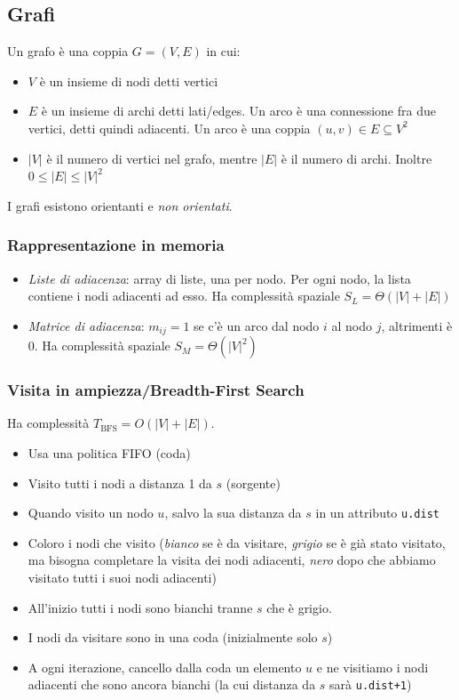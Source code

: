 \documentclass[10pt,a4paper]{article}
\newcommand{\code}{\texttt}
\begin{document}
\begin{multicols*}{2}
\subsection*{Grafi}
Un grafo è una coppia $G = (V,E)$ in cui:
\begin{itemize}
    \item $V$ è un insieme di nodi detti vertici
    \item $E$ è un insieme di archi detti lati/edges. Un arco è una connessione fra due vertici, detti quindi adiacenti. Un arco è una coppia $(u,v) \in E \subseteq V^2$
    \item $|V|$ è il numero di vertici nel grafo, mentre $|E|$ è il numero di archi. Inoltre $0 \le |E| \le |V|^2$
\end{itemize}
I grafi esistono orientanti e \emph{non orientati}.
\subsubsection*{Rappresentazione in memoria}
\begin{itemize}
    \item \emph{Liste di adiacenza}: array di liste, una per nodo. Per ogni nodo, la lista contiene i nodi adiacenti ad esso. Ha complessità spaziale $S_L = \varTheta(|V|+|E|)$
    \item \emph{Matrice di adiacenza}: $m_{ij} = 1$ se c'è un arco dal nodo $i$ al nodo $j$, altrimenti è $0$. Ha complessità spaziale $S_M = \varTheta(|V|^2)$
\end{itemize}
\subsubsection*{Visita in ampiezza/Breadth-First Search}
Ha complessità $T_\text{BFS} = O(|V| + |E|)$.
\begin{itemize}
    \item Usa una politica FIFO (coda)
    \item Visito tutti i nodi a distanza 1 da $s$ (sorgente)
    \item Quando visito un nodo $u$, salvo la sua distanza da $s$ in un attributo \code{u.dist}
    \item Coloro i nodi che visito (\emph{bianco} se è da visitare, \emph{grigio} se è già stato visitato, ma bisogna completare la visita dei nodi adiacenti, \emph{nero} dopo che abbiamo visitato tutti i suoi nodi adiacenti)
    \item All'inizio tutti i nodi sono bianchi tranne $s$ che è grigio.
    \item I nodi da visitare sono in una coda (inizialmente solo $s$)
    \item A ogni iterazione, cancello dalla coda un elemento $u$ e ne visitiamo i nodi adiacenti che sono ancora bianchi (la cui distanza da $s$ sarà \code{u.dist+1})
\end{itemize}


\end{multicols*}
\end{document}
